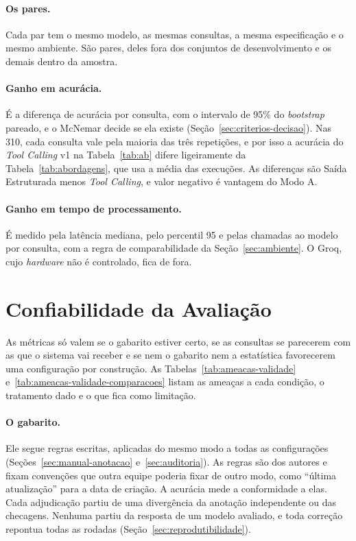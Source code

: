 \paragraph{Os pares.} Cada par tem o mesmo modelo, as mesmas consultas, a mesma especificação e o mesmo ambiente. São  pares,  deles fora dos conjuntos de desenvolvimento e os demais dentro da amostra.

\paragraph{Ganho em acurácia.} É a diferença de acurácia por consulta, com o intervalo de 95\% do \textit{bootstrap} pareado, e o McNemar decide se ela existe (Seção~\ref{sec:criterios-decisao}). Nas 310, cada consulta vale pela maioria das três repetições, e por isso a acurácia do \textit{Tool Calling} v1 na Tabela~\ref{tab:ab} difere ligeiramente da Tabela~\ref{tab:abordagens}, que usa a média das execuções. As diferenças são Saída Estruturada menos \textit{Tool Calling}, e valor negativo é vantagem do Modo A.

\paragraph{Ganho em tempo de processamento.} É medido pela latência mediana, pelo percentil 95 e pelas chamadas ao modelo por consulta, com a regra de comparabilidade da Seção~\ref{sec:ambiente}. O Groq, cujo \textit{hardware} não é controlado, fica de fora.

\section{Confiabilidade da Avaliação}
\label{sec:confiabilidade}

As métricas só valem se o gabarito estiver certo, se as consultas se parecerem com as que o sistema vai receber e se nem o gabarito nem a estatística favorecerem uma configuração por construção. As Tabelas~\ref{tab:ameacas-validade} e~\ref{tab:ameacas-validade-comparacoes} listam as ameaças a cada condição, o tratamento dado e o que fica como limitação.

\paragraph{O gabarito.} Ele segue regras escritas, aplicadas do mesmo modo a todas as configurações (Seções~\ref{sec:manual-anotacao} e~\ref{sec:auditoria}). As regras são dos autores e fixam convenções que outra equipe poderia fixar de outro modo, como ``última atualização'' para a data de criação. A acurácia mede a conformidade a elas. Cada adjudicação partiu de uma divergência da anotação independente ou das checagens. Nenhuma partiu da resposta de um modelo avaliado, e toda correção repontua todas as rodadas (Seção~\ref{sec:reprodutibilidade}).


